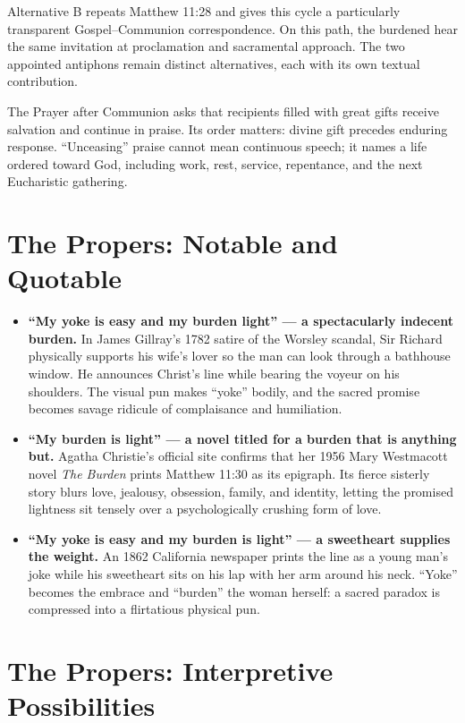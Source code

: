 \begin{deepstudy}
Alternative B repeats Matthew 11:28 and gives this cycle a particularly transparent Gospel--Communion correspondence. On this path, the burdened hear the same invitation at proclamation and sacramental approach. The two appointed antiphons remain distinct alternatives, each with its own textual contribution.

The Prayer after Communion asks that recipients filled with great gifts receive salvation and continue in praise. Its order matters: divine gift precedes enduring response. “Unceasing” praise cannot mean continuous speech; it names a life ordered toward God, including work, rest, service, repentance, and the next Eucharistic gathering.

\section*{The Propers: Notable and Quotable}

{\small
\begin{itemize}
\item \textbf{“My yoke is easy and my burden light” --- a spectacularly indecent burden.\enspace{}} In James Gillray's 1782 satire of the Worsley scandal, Sir Richard physically supports his wife's lover so the man can look through a bathhouse window. He announces Christ's line while bearing the voyeur on his shoulders. The visual pun makes “yoke” bodily, and the sacred promise becomes savage ridicule of complaisance and humiliation.

\item \textbf{“My burden is light” --- a novel titled for a burden that is anything but.\enspace{}} Agatha Christie's official site confirms that her 1956 Mary Westmacott novel \emph{The Burden} prints Matthew 11:30 as its epigraph. Its fierce sisterly story blurs love, jealousy, obsession, family, and identity, letting the promised lightness sit tensely over a psychologically crushing form of love.

\item \textbf{“My yoke is easy and my burden is light” --- a sweetheart supplies the weight.\enspace{}} An 1862 California newspaper prints the line as a young man's joke while his sweetheart sits on his lap with her arm around his neck. “Yoke” becomes the embrace and “burden” the woman herself: a sacred paradox is compressed into a flirtatious physical pun.
\end{itemize}
}

\section*{The Propers: Interpretive Possibilities}


\end{deepstudy}
